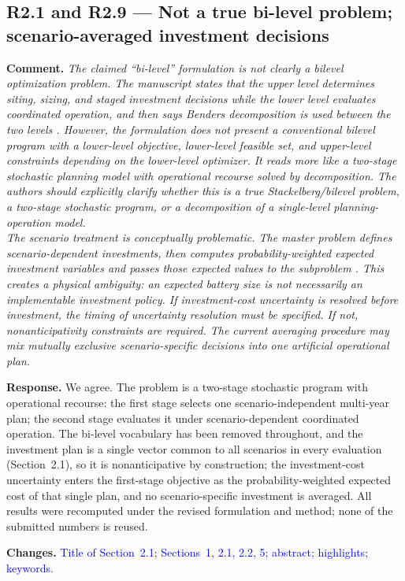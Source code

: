 \documentclass[11pt]{article}
\newcommand{\rcomment}[1]{\par\medskip\noindent\textbf{Comment.} \textit{#1}\par\smallskip}
\newcommand{\rresponse}[1]{\noindent\textbf{Response.} #1\par\smallskip}
\newcommand{\rchanges}[1]{\noindent\textbf{Changes.} \textcolor{blue}{#1}\par\medskip}
\begin{document}
\subsection*{R2.1 and R2.9 --- Not a true bi-level problem; scenario-averaged investment decisions}
\rcomment{
The claimed ``bi-level'' formulation is not clearly a bilevel optimization problem. The manuscript states that the upper level determines siting, sizing, and staged investment decisions while the lower level evaluates coordinated operation, and then says Benders decomposition is used between the two levels . However, the formulation does not present a conventional bilevel program with a lower-level objective, lower-level feasible set, and upper-level constraints depending on the lower-level optimizer. It reads more like a two-stage stochastic planning model with operational recourse solved by decomposition. The authors should explicitly clarify whether this is a true Stackelberg/bilevel problem, a two-stage stochastic program, or a decomposition of a single-level planning-operation model.\\
The scenario treatment is conceptually problematic. The master problem defines scenario-dependent investments, then computes probability-weighted expected investment variables and passes those expected values to the subproblem . This creates a physical ambiguity: an expected battery size is not necessarily an implementable investment policy. If investment-cost uncertainty is resolved before investment, the timing of uncertainty resolution must be specified. If not, nonanticipativity constraints are required. The current averaging procedure may mix mutually exclusive scenario-specific decisions into one artificial operational plan.
}
\rresponse{We agree. The problem is a two-stage stochastic program with operational recourse: the first
stage selects one scenario-independent multi-year plan; the second stage evaluates it under
scenario-dependent coordinated operation. The bi-level vocabulary has been removed throughout, and the
investment plan is a single vector common to all scenarios in every evaluation (Section~2.1), so it is
nonanticipative by construction; the investment-cost uncertainty enters the first-stage objective as the
probability-weighted expected cost of that single plan, and no scenario-specific investment is averaged.
All results were recomputed under the revised formulation and method; none of the submitted numbers is
reused.}
\rchanges{Title of Section~2.1; Sections~1, 2.1, 2.2, 5; abstract; highlights; keywords.}
\end{document}
